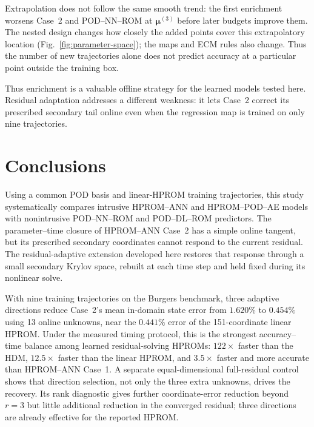 \documentclass[11pt]{article}
\newcommand{\mub}{\bm\mu}
\begin{document}
Extrapolation does not follow the same smooth trend: the first enrichment
worsens Case~2 and POD--NN--ROM at $\mub^{(3)}$ before later budgets improve
them.  The nested design changes how closely the added points cover this
extrapolatory location (Fig.~\ref{fig:parameter-space}); the maps and ECM
rules also change.  Thus the number of new trajectories alone does not
predict accuracy at a particular point outside the training box.

Thus enrichment is a valuable offline strategy for the learned models
tested here.  Residual adaptation addresses a different weakness:
it lets Case~2 correct its prescribed secondary tail online even when the
regression map is trained on only nine trajectories.

\section{Conclusions}
\label{sec:conclusions}
Using a common POD basis and linear-HPROM training trajectories, this
study systematically compares intrusive HPROM--ANN and HPROM--POD--AE
models with nonintrusive POD--NN--ROM and POD--DL--ROM predictors.
The parameter--time closure of HPROM--ANN Case~2 has a simple online
tangent, but its prescribed secondary coordinates cannot respond to the
current residual.  The residual-adaptive extension developed here restores
that response through a small secondary Krylov space, rebuilt at each time
step and held fixed during its nonlinear solve.

With nine training trajectories on the Burgers benchmark, three adaptive
directions reduce Case~2's mean in-domain state error from $1.620\%$ to
$0.454\%$ using 13 online unknowns, near the $0.441\%$ error of the
151-coordinate linear HPROM.  Under the measured timing protocol, this is
the strongest accuracy--time balance among learned residual-solving
HPROMs: $122\times$ faster than the HDM, $12.5\times$ faster than the
linear HPROM, and $3.5\times$ faster and more accurate than HPROM--ANN
Case~1.  A separate equal-dimensional full-residual control shows that
direction selection, not only the three extra unknowns, drives the
recovery.  Its rank diagnostic gives further coordinate-error reduction
beyond $r=3$ but little additional reduction in the converged residual;
three directions are already effective for the reported HPROM.
\end{document}
